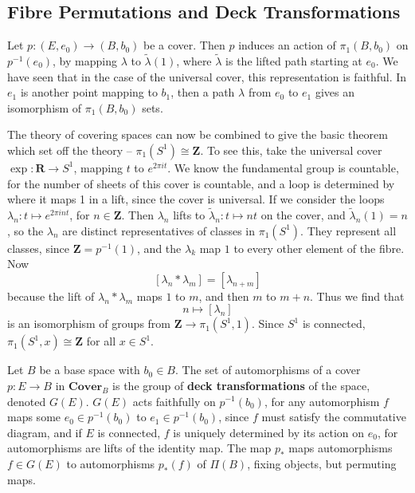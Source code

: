\subsection{Fibre Permutations and Deck Transformations}

Let $p: (E,e_0) \to (B,b_0)$ be a cover. Then $p$ induces an action of $\pi_1(B,b_0)$ on $p^{-1}(e_0)$, by mapping $\lambda$ to $\tilde{\lambda}(1)$, where $\tilde{\lambda}$ is the lifted path starting at $e_0$. We have seen that in the case of the universal cover, this representation is faithful. In $e_1$ is another point mapping to $b_1$, then a path $\lambda$ from $e_0$ to $e_1$ gives an isomorphism of $\pi_1(B,b_0)$ sets.

\begin{example}
    The theory of covering spaces can now be combined to give the basic theorem which set off the theory -- $\pi_1(S^1) \cong \mathbf{Z}$. To see this, take the universal cover $\exp: \mathbf{R} \to S^1$, mapping $t$ to $e^{2 \pi it}$. We know the fundamental group is countable, for the number of sheets of this cover is countable, and a loop is determined by where it maps 1 in a lift, since the cover is universal. If we consider the loops $\lambda_n: t \mapsto e^{2 \pi i n t}$, for $n \in \mathbf{Z}$. Then $\lambda_n$ lifts to $\tilde{\lambda}_n: t \mapsto nt$ on the cover, and $\tilde{\lambda}_n(1) = n$, so the $\lambda_n$ are distinct representatives of classes in $\pi_1(S^1)$. They represent all classes, since $\mathbf{Z} = p^{-1}(1)$, and the $\lambda_k$ map $1$ to every other element of the fibre. Now
    \[ [\lambda_n * \lambda_m] = [\lambda_{n+m}] \]
    because the lift of $\lambda_n * \lambda_m$ maps $1$ to $m$, and then $m$ to $m + n$. Thus we find that
    \[ n \mapsto [\lambda_n] \]
    is an isomorphism of groups from $\mathbf{Z} \to \pi_1(S^1, 1)$. Since $S^1$ is connected, $\pi_1(S^1, x) \cong \mathbf{Z}$ for all $x \in S^1$.
\end{example}

Let $B$ be a base space with $b_0 \in B$. The set of automorphisms of a cover $p: E \to B$ in $\textbf{Cover}_B$ is the group of {\bf deck transformations} of the space, denoted $G(E)$. $G(E)$ acts faithfully on $p^{-1}(b_0)$, for any automorphism $f$ maps some $e_0 \in p^{-1}(b_0)$ to $e_1 \in p^{-1}(b_0)$, since $f$ must satisfy the commutative diagram, and if $E$ is connected, $f$ is uniquely determined by its action on $e_0$, for automorphisms are lifts of the identity map. The map $p_*$ maps automorphisms $f \in G(E)$ to automorphisms $p_*(f)$ of $\Pi(B)$, fixing objects, but permuting maps.

